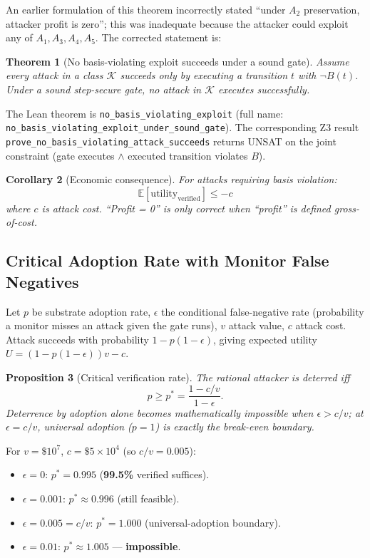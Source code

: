 \documentclass[11pt,a4paper]{article}
\newtheorem{theorem}{Theorem}
\newtheorem{corollary}[theorem]{Corollary}
\newtheorem{proposition}[theorem]{Proposition}
\begin{document}
An earlier formulation of this theorem incorrectly stated ``under $A_2$ preservation, attacker profit is zero''; this was inadequate because the attacker could exploit any of $A_1, A_3, A_4, A_5$. The corrected statement is:

\begin{theorem}[No basis-violating exploit succeeds under a sound gate]\label{thm:no-basis-exploit}
Assume every attack in a class $\mathcal{K}$ succeeds only by executing a transition $t$ with $\neg B(t)$. Under a sound step-secure gate, no attack in $\mathcal{K}$ executes successfully.
\end{theorem}

\begingroup\sloppy
The Lean theorem is \texttt{no\_basis\_violating\_exploit} (full name: \texttt{no\_basis\_violating\_exploit\_\allowbreak under\_sound\_gate}). The corresponding Z3 result \texttt{prove\_no\_\allowbreak basis\_violating\_\allowbreak attack\_succeeds} returns UNSAT on the joint constraint (gate executes $\wedge$ executed transition violates $B$).
\endgroup

\begin{corollary}[Economic consequence]
For attacks requiring basis violation:
\[
\mathbb{E}[\mathrm{utility}_{\mathrm{verified}}] \leq -c
\]
where $c$ is attack cost. ``Profit = 0'' is only correct when ``profit'' is defined gross-of-cost.
\end{corollary}

\subsection{Critical Adoption Rate with Monitor False Negatives}

Let $p$ be substrate adoption rate, $\epsilon$ the conditional false-negative rate (probability a monitor misses an attack given the gate runs), $v$ attack value, $c$ attack cost. Attack succeeds with probability $1 - p(1-\epsilon)$, giving expected utility $U = (1 - p(1-\epsilon)) v - c$.

\begin{proposition}[Critical verification rate]\label{prop:p-star-eps}
The rational attacker is deterred iff
\[
p \geq p^* = \frac{1 - c/v}{1 - \epsilon}.
\]
Deterrence by adoption alone becomes mathematically impossible when $\epsilon > c/v$; at $\epsilon = c/v$, universal adoption ($p = 1$) is exactly the break-even boundary.
\end{proposition}

For $v = \$10^7$, $c = \$5 \times 10^4$ (so $c/v = 0.005$):
\begin{itemize}
  \item $\epsilon = 0$: $p^* = 0.995$ (\textbf{99.5\%} verified suffices).
  \item $\epsilon = 0.001$: $p^* \approx 0.996$ (still feasible).
  \item $\epsilon = 0.005 = c/v$: $p^* = 1.000$ (universal-adoption boundary).
  \item $\epsilon = 0.01$: $p^* \approx 1.005$ — \textbf{impossible}.
\end{itemize}
\end{document}

